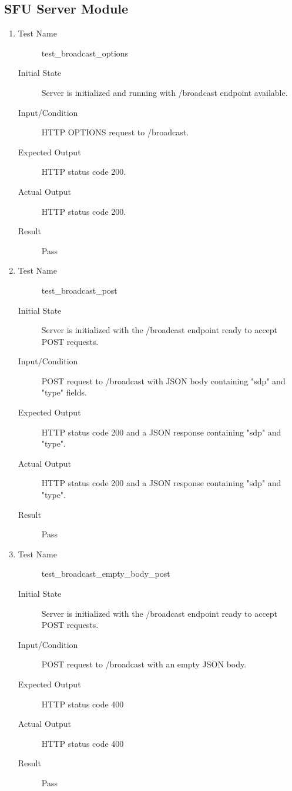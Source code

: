 \documentclass[12pt, titlepage]{article}
\begin{document}
\subsection{SFU Server Module}
\begin{enumerate}[UT-S1]
\item \label{UT-S1}
  \begin{description}
  \item[Test Name] test\_broadcast\_options
  \item[Initial State] Server is initialized and running with /broadcast
    endpoint available.
  \item[Input/Condition] HTTP OPTIONS request to /broadcast.
  \item[Expected Output] HTTP status code 200.
  \item[Actual Output] HTTP status code 200.
  \item[Result] Pass
  \end{description}

\item \label{UT-S2}
  \begin{description}
  \item[Test Name] test\_broadcast\_post
  \item[Initial State] Server is initialized with the /broadcast endpoint ready
    to accept POST requests.
  \item[Input/Condition] POST request to /broadcast with JSON body containing
    "sdp" and "type" fields.
  \item[Expected Output] HTTP status code 200 and a JSON response containing
    "sdp" and "type".
  \item[Actual Output] HTTP status code 200 and a JSON response containing "sdp"
    and "type".
  \item[Result] Pass
  \end{description}

\item \label{UT-S3}
  \begin{description}
  \item[Test Name] test\_broadcast\_empty\_body\_post
  \item[Initial State] Server is initialized with the /broadcast endpoint ready
    to accept POST requests.
  \item[Input/Condition] POST request to /broadcast with an empty JSON body.
  \item[Expected Output] HTTP status code 400
  \item[Actual Output] HTTP status code 400
  \item[Result] Pass
  \end{description}


\end{enumerate}
\end{document}

